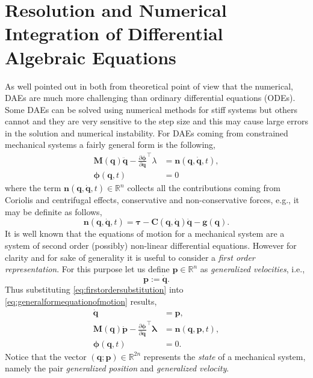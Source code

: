 %
%

\chapter{Resolution and Numerical Integration of Differential Algebraic Equations}
	\label{ch:overview}
		As well pointed out in \cite{petzold1982differential} both from theoretical point of view that the numerical, DAEs are much more challenging than ordinary differential equations (ODEs). Some DAEs can be solved using numerical methods for stiff systems but others cannot and they are very sensitive to the step size and this may cause large errors in the solution and numerical instability. For DAEs coming from constrained mechanical systems a fairly general form is the following, 
		\begin{subequations}
		\label{eq:generalformequationofmotion}
			\begin{align}
				\bm{M}(\bm{q})\ddot{\bm{q}} -\frac{\partial\bm{\phi}}{\partial\bm{q}}^{\intercal}\lambda &= \bm{n}(\bm{q},\dot{\bm{q}},t),\\
				\bm{\phi}(\bm{q},t) &= 0
			\end{align}
		\end{subequations}
		where the term $\bm{n}(\bm{q},\dot{\bm{q}},t)\in\mathbb{R}^{n}$ collects all the contributions coming from Coriolis and centrifugal effects, conservative and non-conservative forces, e.g., it may be definite as follows,
		\begin{equation*}
			\bm{n}(\bm{q},\dot{\bm{q}},t) = \bm{\tau}-\bm{C}(\bm{q},\dot{\bm{q}})\dot{\bm{q}}-\bm{g}(\bm{q}).
		\end{equation*}
		It is well known that the equations of motion for a mechanical system are a system of second order (possibly) non-linear differential equations. However for clarity and for sake of generality  it is useful to consider a \emph{first order representation}. For this purpose let us define $\bm{p}\in\mathbb{R}^{n}$ as \emph{generalized velocities}, i.e.,
		\begin{equation}
			\label{eq:firstordersubstitution}
			\bm{p} := \dot{\bm{q}}.
		\end{equation}
		Thus substituting \cref{eq:firstordersubstitution} into \cref{eq:generalformequationofmotion} results, 
		\begin{subequations}
		\label{eq:generalequationofmotionfirstorder}
			\begin{align}
				\dot{\bm{q}} &= \bm{p}, \\
				\bm{M}(\bm{q})\dot{\bm{p}} -\frac{\partial\bm{\phi}}{\partial\bm{q}}^{\intercal}\bm{\lambda} &= \bm{n}(\bm{q},\bm{p},t),\\
				\bm{\phi}(\bm{q},t) &= 0.
			\end{align}
		\end{subequations}
		Notice that the vector $(\bm{q};\bm{p})\in\mathbb{R}^{2n}$ represents the \emph{state} of a mechanical system, namely the pair \emph{generalized position} and \emph{generalized velocity}.
		
